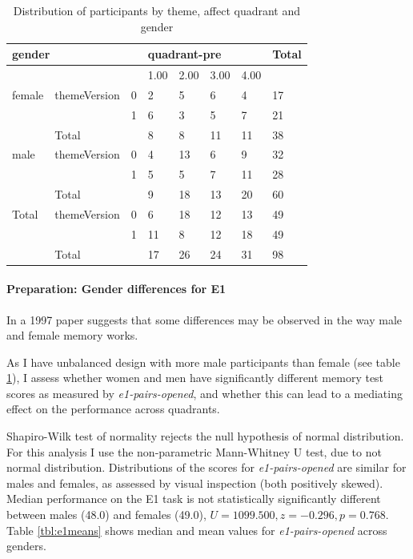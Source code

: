 		\begin{table}[h!]
			\centering
			\begin{tabular}{ll|l|llll|l}
				\hline
				\multicolumn{3}{l}{gender} & \multicolumn{4}{l}{quadrant-pre} & Total \\ \hline
				&              &   & 1.00    & 2.00   & 3.00   & 4.00   &       \\ \hline
				female  & themeVersion & 0 & 2       & 5      & 6      & 4      & 17    \\
				&              & 1 & 6       & 3      & 5      & 7      & 21    \\ \hline
				& Total        &   & 8       & 8      & 11     & 11     & 38    \\ \hline \hline
				male    & themeVersion & 0 & 4       & 13     & 6      & 9      & 32    \\
				&              & 1 & 5       & 5      & 7      & 11     & 28    \\ \hline
				& Total        &   & 9       & 18     & 13     & 20     & 60    \\ \hline \hline
				Total   & themeVersion & 0 & 6       & 18     & 12     & 13     & 49    \\
				&              & 1 & 11      & 8      & 12     & 18     & 49    \\ \hline \hline
				& Total        &   & 17      & 26     & 24     & 31     & 98 	\\ \hline \hline
			\end{tabular}
			\caption{Distribution of participants by theme, affect quadrant and gender}
			\label{tbl:distribution}
		\end{table}
		
		\paragraph{Preparation: Gender differences for E1}
		
		In a 1997 paper \cite{McBurney1997} suggests that some differences may be observed in the way male and female memory works.
		
		As I have unbalanced design with more male participants than female (see table \ref{tbl:distribution}), I assess whether women and men have significantly different memory test scores as measured by \textit{e1-pairs-opened}, and whether this can lead to a mediating effect on the performance across quadrants.
		
		Shapiro-Wilk test of normality rejects the null hypothesis of normal distribution. For this analysis I use the non-parametric Mann-Whitney U test, due to not normal distribution. Distributions of the scores for \textit{e1-pairs-opened} are similar for males and females, as assessed by visual inspection (both positively skewed). Median performance on the E1 task is not statistically significantly different between males (48.0) and females (49.0), $ U = 1099.500, z = -0.296, p = 0.768 $. Table \ref{tbl:e1means} shows median and mean values for \textit{e1-pairs-opened} across genders.
		
